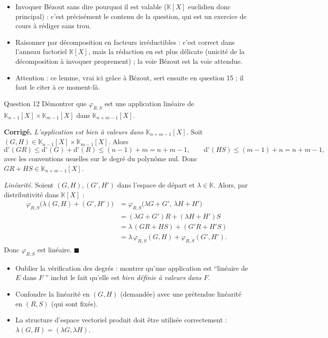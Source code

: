 \documentclass[11pt,a4paper]{article}
\newenvironment{corrige}
  {\par\medskip\noindent
   \begin{tcolorbox}[blanker, breakable,
     borderline west={2.5pt}{0pt}{vertP},
     left=10pt, top=2pt, bottom=2pt]
   {\color{vertP}\bfseries Corrigé.}\hspace{0.5em}\ignorespaces}
  {\hfill$\blacksquare$\end{tcolorbox}\medskip}
\newcommand{\og}{``}
\newcommand{\fg}{''}
\newcommand{\K}{\mathbb{K}}
\newcommand{\dg}[1]{\mathrm{d}^{\circ}\!\left(#1\right)}
\begin{document}
\begin{pieges}
\begin{itemize}[leftmargin=1.4em, itemsep=2pt]
\item Invoquer Bézout sans dire pourquoi il est valable ($\K[X]$
euclidien donc principal) : c'est précisément le contenu de la
question, qui est un exercice de cours à rédiger sans trou.
\item Raisonner par décomposition en facteurs irréductibles : c'est
correct dans l'anneau factoriel $\K[X]$, mais la rédaction en est
plus délicate (unicité de la décomposition à invoquer proprement) ;
la voie Bézout est la voie attendue.
\item Attention : ce lemme, vrai ici grâce à Bézout, sert ensuite en
question 15 ; il faut le citer à ce moment-là.
\end{itemize}
\end{pieges}

\begin{enonce}{Question 12}
Démontrer que $\varphi_{R,S}$ est une application linéaire de
$\K_{n-1}[X]\times\K_{m-1}[X]$ dans $\K_{n+m-1}[X]$.
\end{enonce}

\begin{corrige}
\emph{L'application est bien à valeurs dans $\K_{n+m-1}[X]$.} Soit
$(G,H)\in\K_{n-1}[X]\times\K_{m-1}[X]$. Alors
\[
\dg{GR}\le\dg{G}+\dg{R}\le (n-1)+m=n+m-1,
\qquad
\dg{HS}\le (m-1)+n=n+m-1,
\]
avec les conventions usuelles sur le degré du polynôme nul. Donc
$GR+HS\in\K_{n+m-1}[X]$.

\emph{Linéarité.} Soient $(G,H),(G',H')$ dans l'espace de départ et
$\lambda\in\K$. Alors, par distributivité dans $\K[X]$ :
\begin{align*}
\varphi_{R,S}\big(\lambda(G,H)+(G',H')\big)
&=\varphi_{R,S}\big(\lambda G+G',\,\lambda H+H'\big)\\
&=(\lambda G+G')R+(\lambda H+H')S\\
&=\lambda\,(GR+HS)+(G'R+H'S)\\
&=\lambda\,\varphi_{R,S}(G,H)+\varphi_{R,S}(G',H').
\end{align*}
Donc $\varphi_{R,S}$ est linéaire.
\end{corrige}

\begin{pieges}
\begin{itemize}[leftmargin=1.4em, itemsep=2pt]
\item Oublier la vérification des degrés : montrer qu'une application
est \og linéaire de $E$ dans $F$ \fg{} inclut le fait qu'elle est
\emph{bien définie à valeurs dans $F$}.
\item Confondre la linéarité en $(G,H)$ (demandée) avec une
prétendue linéarité en $(R,S)$ (qui sont fixés).
\item La structure d'espace vectoriel produit doit être utilisée
correctement : $\lambda(G,H)=(\lambda G,\lambda H)$.
\end{itemize}
\end{pieges}
\end{document}
